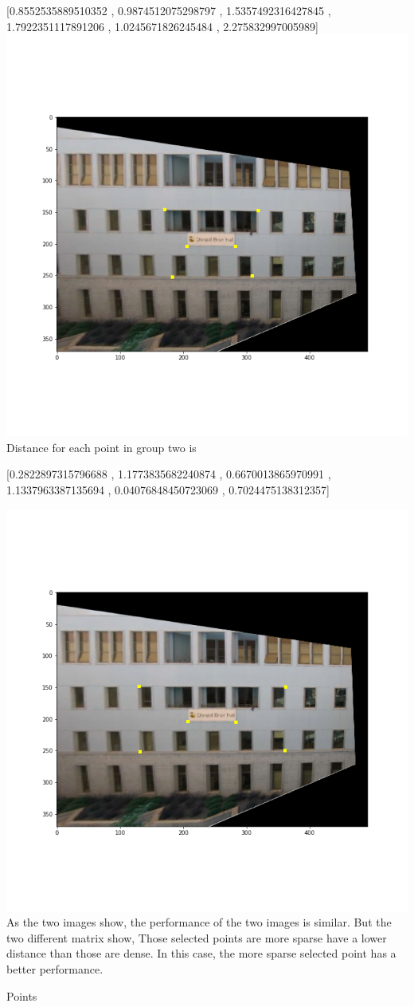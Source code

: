 \documentclass[]{article}
\begin{document}
[0.8552535889510352 , 0.9874512075298797 , 1.5357492316427845 , 1.7922351117891206 , 1.0245671826245484 , 2.275832997005989]\\
\includegraphics[width=\textwidth]{wraped.png}\\

Distance for each point in group two is

[0.2822897315796688 , 1.1773835682240874 , 0.6670013865970991 , 1.1337963387135694 , 0.04076848450723069 , 0.7024475138312357]

\includegraphics[width=\textwidth]{wraped2.png}\\

As the two images show, the performance of the two images is similar. But the two different matrix show, Those selected points are more sparse have a lower distance than those are dense. In this case, the more sparse selected point has a better performance.

Points 
\end{document}
